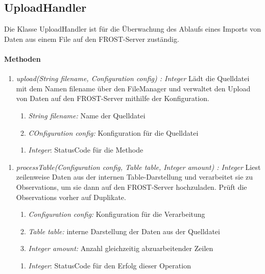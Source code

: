 \subsection{UploadHandler}
\label{uploadHandler}
Die Klasse UploadHandler ist für die Überwachung des Ablaufs eines Imports von Daten aus einem File auf den FROST-Server zuständig.

\paragraph{Methoden}
\begin{enumerate}[+]
\item \textit{upload(String filename, Configuration config) : Integer}
Lädt die Quelldatei mit dem Namen filename über den FileManager und verwaltet den Upload von Daten auf den FROST-Server mithilfe der Konfiguration.
\begin{enumerate}[$\bullet$]
\item \textit{String filename:} Name der Quelldatei
\item \textit{COnfiguration config:} Konfiguration für die Quelldatei 
\end{enumerate}
\vspace{-0.2cm}
\begin{enumerate}[$\circ$]
\item \textit{Integer}: StatusCode für die Methode
\end{enumerate}
\end{enumerate}

\begin{enumerate}[$-$]
\item \textit{processTable(Configuration config, Table table, Integer amount) : Integer} Liest zeilenweise Daten aus der internen Table-Darstellung und verarbeitet sie zu Observations, um sie dann auf den FROST-Server hochzuladen. Prüft die Observations vorher auf Duplikate.
\begin{enumerate}[$\bullet$]
\item \textit{Configuration config:} Konfiguration für die Verarbeitung
\item \textit{Table table:} interne Darstellung der Daten aus der Quelldatei
\item \textit{Integer amount:} Anzahl gleichzeitig abzuarbeitender Zeilen
\end{enumerate}
\vspace{-0.2cm}
\begin{enumerate}[$\circ$]
\item \textit{Integer}: StatusCode für den Erfolg dieser Operation
\end{enumerate}
\end{enumerate}